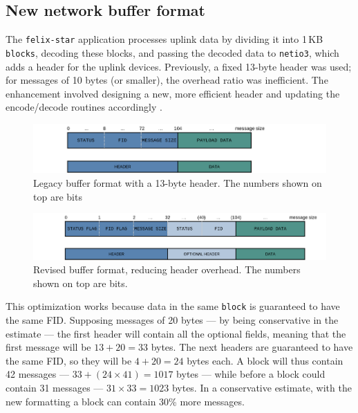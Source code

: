 \subsection{New network buffer format}

The \texttt{felix-star} application processes uplink data by dividing it into 1\,KB \texttt{blocks}, decoding these blocks, and passing the decoded data to \texttt{netio3}, which adds a header for the uplink devices. 
Previously, a fixed 13-byte header was used; for messages of 10 bytes (or smaller), the overhead ratio was inefficient.
The enhancement involved designing a new, more efficient header and updating the encode/decode routines accordingly \cite{netio3-header-commit}.\\

\begin{figure}[htbp]
\centering
\includegraphics[width=\textwidth]{images/contributions/old-buffer-format.png}
\caption[Legacy format of network buffer]{Legacy buffer format with a 13-byte header. The numbers shown on top are bits}
\label{fig:old-buffer-format}
\end{figure}

\begin{figure}[htbp]
\centering
\includegraphics[width=\textwidth]{images/contributions/new-buffer-format.png}
\caption[New network buffer format]{Revised buffer format, reducing header overhead. The numbers shown on top are bits.}
\label{fig:new-buffer-format}
\end{figure}

This optimization works because data in the same \texttt{block} is guaranteed to have the same \acs{FID}.
Supposing messages of 20 bytes --- by being conservative in the estimate --- the first header will contain all the optional fields, meaning that the first message will be $13 + 20 = 33$ bytes. The next headers are guaranteed to have the same \acs{FID}, so they will be $4 + 20 = 24$ bytes each. A block will thus contain 42 messages --- $33 + (24 \times 41) = 1017$ bytes --- while before a block could contain 31 messages --- $31 \times 33 = 1023$ bytes. In a conservative estimate, with the new formatting a block can contain 30\% more messages.